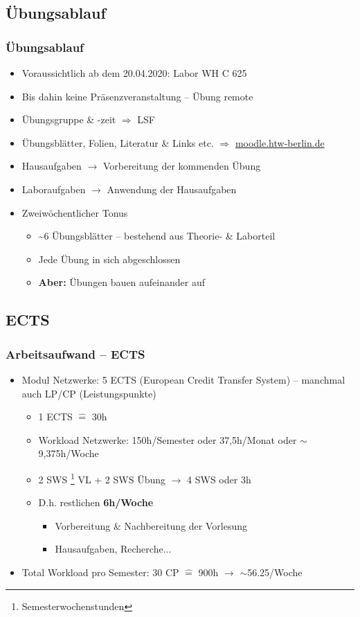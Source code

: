 \documentclass[xcolor=dvipsnames,aspectratio=169]{beamer}
\begin{document}
\subsection{Übungsablauf}
\begin{frame}
	\frametitle{Übungsablauf}
	\begin{itemize}
		\item Voraussichtlich ab dem 20.04.2020: Labor WH C 625
		\item Bis dahin keine Präsenzveranstaltung -- Übung remote
		\item Übungsgruppe \& -zeit $\Rightarrow$ LSF
		\item Übungsblätter, Folien, Literatur \& Links etc. $\Rightarrow$ \url{moodle.htw-berlin.de}
		\item Hausaufgaben $\rightarrow$ Vorbereitung der kommenden Übung
		\item Laboraufgaben $\rightarrow$ Anwendung der Hausaufgaben
		\item Zweiwöchentlicher Tonus 
		\begin{itemize}
			\item \textasciitilde 6 Übungsblätter -- bestehend aus Theorie- \& Laborteil
			\item Jede Übung in sich abgeschlossen
			\item \textbf{Aber:} Übungen bauen aufeinander auf
		\end{itemize}
	\end{itemize}
\end{frame}


\subsection{ECTS}
\begin{frame}
	\frametitle{Arbeitsaufwand -- ECTS}
	\begin{itemize}
		\item Modul Netzwerke: 5 ECTS (European Credit Transfer System) -- manchmal auch LP/CP (Leistungspunkte)
			\begin{itemize}
				\item 1 ECTS $\widehat{=}$ 30h
				\item Workload Netzwerke: 150h/Semester oder 37,5h/Monat oder $\sim$ 9,375h/Woche
				\item 2 SWS \footnote{Semesterwochenstunden} VL + 2 SWS Übung $\rightarrow$ 4 SWS oder 3h
				\item D.h. restlichen \textbf{6h/Woche}
				\begin{itemize}
					\item Vorbereitung \& Nachbereitung der Vorlesung
					\item Hausaufgaben, Recherche...
				\end{itemize}
			\end{itemize}
			\item Total Workload pro Semester: 30 CP $\widehat{=}$ 900h $\rightarrow$  $\sim$56.25/Woche
	\end{itemize}
\end{frame}
\end{document}
